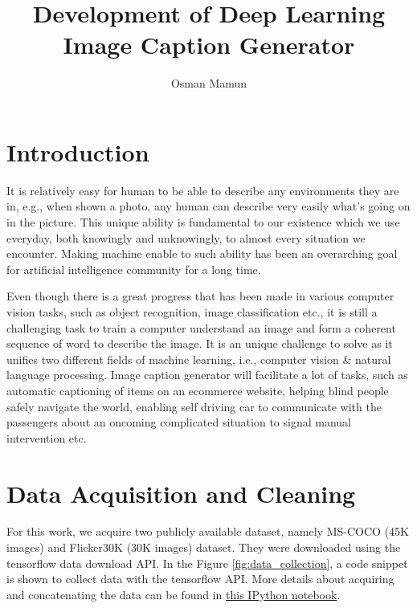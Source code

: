 \documentclass[12pt]{article}
\author{Osman Mamun}
\title{Development of Deep Learning Image Caption Generator}
\begin{document}
\setcounter{page}{-2}
\maketitle
\thispagestyle{empty}
\thispagestyle{empty}
\newpage
\begingroup
\def\addvspace#1{}
\tableofcontents
\endgroup
\thispagestyle{empty}
\newpage
\large
{}
\section{Introduction}
\label{Sec:intro}
It is relatively easy for human to be able to describe any environments they are in, e.g., when shown a photo, any human can describe very easily what's going on in the picture. This unique ability is fundamental to our existence which we use everyday, both knowingly and unknowingly, to almost every situation we encounter. Making machine enable to such ability has been an overarching goal for artificial intelligence community for a long time.

Even though there is a great progress that has been made in various computer vision tasks, such as object recognition, image classification etc., it is still a challenging task to train a computer understand an image and form a coherent sequence of word to describe the image. It is an unique challenge to solve as it unifies two different fields of machine learning, i.e., computer vision & natural language processing. Image caption generator will facilitate a lot of tasks, such as automatic captioning of items on an ecommerce website, helping blind people safely navigate the world, enabling self driving car to communicate with the passengers about an oncoming complicated situation to signal manual intervention etc.


\section{Data Acquisition and Cleaning}
\label{sec:dataclean}

For this work, we acquire two publicly available dataset, namely MS-COCO (45K images) and Flicker30K (30K images) dataset. They were downloaded using the tensorflow data download API. In the Figure \ref{fig:data_collection}, a code snippet is shown to collect data with the tensorflow API. More details about
acquiring and concatenating the data can be found in \href{https://github.com/mamunm/iamge_caption_generator/blob/main/notebooks/data_download.ipynb}{this IPython notebook}.
\end{document}
